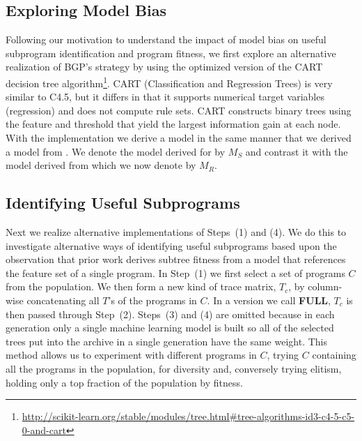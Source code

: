 \subsection{Exploring Model Bias}
Following our motivation to understand the impact of model bias on useful subprogram identification and program fitness, we first explore an alternative realization of BGP's strategy by using the \SCIKIT optimized version of the CART decision tree algorithm\footnote{\url{http://scikit-learn.org/stable/modules/tree.html\#tree-algorithms-id3-c4-5-c5-0-and-cart}}.  CART (Classification and Regression Trees) is very similar to C4.5, but it differs in that it supports numerical target variables (regression) and does not compute rule sets. CART constructs binary trees using the feature and threshold that yield the largest information gain at each node.  With the \SCIKIT implementation we derive a model in the same manner that we derived a model from \REPTREE.  We denote the model derived for \SCIKIT by $M_S$ and contrast it with the model derived from \REPTREE which we now denote by $M_R$.

\subsection{Identifying Useful Subprograms}
\newcommand{\FULL}{\textbf{FULL}\xspace}
\newcommand{\DRAW}{\textbf{DRAW}\xspace}
Next we realize alternative implementations of Steps~(1) and (4). We do this to investigate alternative ways of identifying useful subprograms based upon the observation that prior work derives subtree fitness from a model that references the feature set of a single program. In Step~(1) we first select a set of programs  $C$ from the population. We then form a new kind of trace matrix, $T_c$, by column-wise concatenating all $T${'s} of the programs in $C$. In a version we call \FULL,  $T_c$ is then passed through Step~(2). Steps~(3) and (4) are omitted because in each generation only a single machine learning model is built so all of the selected trees put into the archive in a single generation have the same weight.  This method allows us to experiment with different programs in $C$, trying $C$ containing all the programs in the population, for diversity and, conversely trying elitism, holding only a top fraction of the  population by fitness. 


